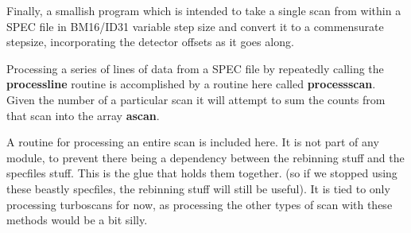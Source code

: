 \documentclass[10pt,a4paper,notitlepage]{article}
\newcommand{\var}[1]{\textbf{\textsf{#1}}} %
\newcommand{\code}[1]{\textbf{\textsf{#1}}} %
\begin{document}
Finally, a smallish program which is intended to take a single scan from 
within a SPEC file in BM16/ID31 variable step size and convert it to a 
commensurate stepsize, incorporating the detector offsets as it goes along.

Processing a series of lines of data from a SPEC file by repeatedly calling 
the \code{processline} routine is accomplished by a routine here 
called \code{processscan}.
Given the number of a particular scan it will attempt to sum the counts
from that scan into the array \var{ascan}.

A routine for processing an entire scan is included here. It is 
not part of any module, to prevent there being a dependency
between the rebinning stuff and the specfiles stuff. This
is the glue that holds them together. (so if we stopped using
these beastly specfiles, the rebinning stuff will still be 
useful). 
It is tied to only processing turboscans for now, as processing
the other types of scan with these methods would be a bit silly.
 
\end{document}
